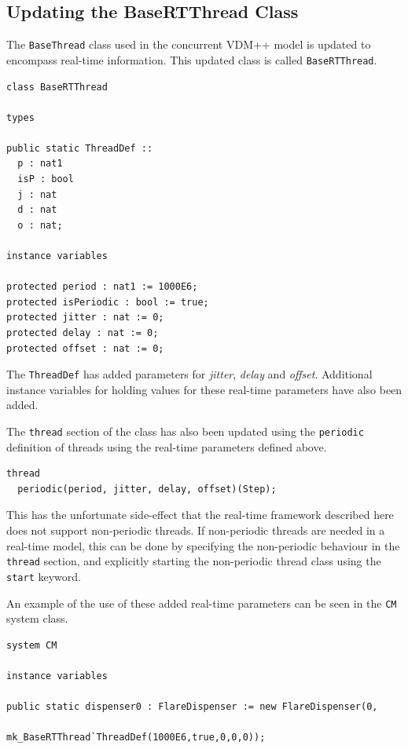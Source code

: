 \documentclass{overturerepchap}
\begin{document}
\subsection{Updating the BaseRTThread Class}

The \texttt{BaseThread} class used in the concurrent VDM++ model is updated to encompass real-time information. This updated class is called \texttt{BaseRTThread}.

\begin{lstlisting}
class BaseRTThread

types

public static ThreadDef ::
  p : nat1
  isP : bool
  j : nat
  d : nat
  o : nat;
	
instance variables

protected period : nat1 := 1000E6;
protected isPeriodic : bool := true;
protected jitter : nat := 0;
protected delay : nat := 0;
protected offset : nat := 0;
\end{lstlisting}

The \texttt{ThreadDef} has added parameters for \emph{jitter}, \emph{delay} and \emph{offset}. Additional instance variables for holding values for these real-time parameters have also been added.

The \texttt{thread} section of the class has also been updated using the \texttt{periodic} definition of threads using the real-time parameters defined above.

\begin{lstlisting}
thread
  periodic(period, jitter, delay, offset)(Step);
\end{lstlisting}

This has the unfortunate side-effect that the real-time framework described here does not support non-periodic threads. If non-periodic threads are needed in a real-time model, this can be done by specifying the non-periodic behaviour in the \texttt{thread} section, and explicitly starting the non-periodic thread class using the \texttt{start} keyword.

An example of the use of these added real-time parameters can be seen in the \texttt{CM} system class.

\begin{lstlisting}
system CM

instance variables

public static dispenser0 : FlareDispenser := new FlareDispenser(0, 
                           mk_BaseRTThread`ThreadDef(1000E6,true,0,0,0));
\end{lstlisting}
\end{document}

